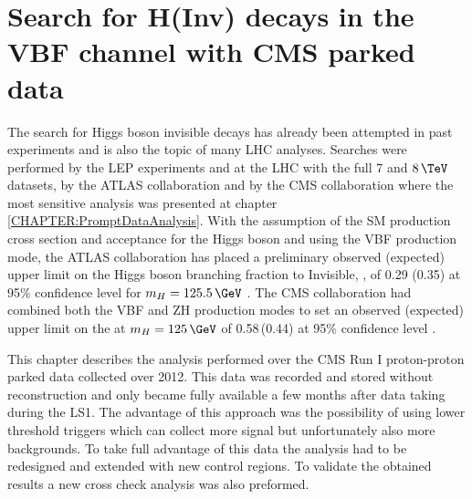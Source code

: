 \chapter{Search for H(Inv) decays in the VBF channel with CMS parked data}
\label{CHAPTER:ParkedDataAnalysis}

\glsresetall %



The search for Higgs boson invisible decays has already been attempted in past experiments and is also the topic of many \gls{LHC} analyses. Searches were performed by the \gls{LEP} experiments \cite{ARTICLE:LEPSearchesForInvisibleHiggsBosons,ARTICLE:LEPDELPHISearchesForInvisibleDecayingHiggsBosons,ARTICLE:LEPOPALSearchForInvisiblyDecayingHiggsBosons} and at the \gls{LHC} with the full 7 and $8\,\TeV$ datasets, by the \gls{ATLAS} collaboration \cite{ARTICLE:ATLASSearchForInvisibleDecaysHiggsBosonAssociatedZ,ARTICLE:ATLASSearchForDarkMatterWithHadronicallyWorZ,ARTICLE:ATLASMonoJetPlusMET,ARTICLE:ATLASVBFHiggsInvConfNote} and by the \gls{CMS} collaboration \cite{ARTICLE:CMSVBFHiggsToInvAndZHCombination} where the most sensitive analysis was presented at chapter \ref{CHAPTER:PromptDataAnalysis}. With the assumption of the \gls{SM} production cross section and acceptance for the Higgs boson and using the \gls{VBF} production mode, the \gls{ATLAS} collaboration has placed a preliminary observed (expected) upper limit on the Higgs boson branching fraction to Invisible, \BRinv, of 0.29 (0.35) at 95\% confidence level for $m_H=125.5\,\GeV$ \cite{ARTICLE:ATLASVBFHiggsInvConfNote}. The \gls{CMS} collaboration had combined both the \gls{VBF} and ZH production modes to set an observed (expected) upper limit on the \BRinv at  $m_H=125\,\GeV$ of 0.58\,(0.44) at 95\% confidence level \cite{ARTICLE:CMSVBFHiggsToInvAndZHCombination}.

This chapter describes the analysis performed over the \gls{CMS} Run I proton-proton parked data collected over 2012. This data was recorded and stored without reconstruction and only became fully available a few months after data taking during the \gls{LS1}. The advantage of this approach was the possibility of using lower threshold triggers which can collect more signal but unfortunately also more backgrounds. To take full advantage of this data the analysis had to be redesigned and extended with new control regions. To validate the obtained results a new cross check analysis was also preformed.


